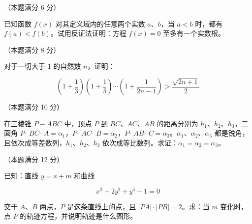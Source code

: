 \begin{question}
（本题满分 6 分）

已知函数 $f(x)$ 对其定义域内的任意两个实数 $a\text{、}b$，当 $a<b$ 时，都有 $f(a)<f(b)$。试用反证法证明：方程 $f(x)=0$ 至多有一个实数根。

\end{question}
\begin{question}
（本题满分 8 分）

对于一切大于 1 的自然数 $n$，证明：

\nopagebreak[4]
\[
\left(1+\frac13\right)\left(1+\frac15\right)\cdots\left(1+\frac1{2n-1}\right)>\frac{\sqrt{2n+1}}2
\]

\end{question}
\begin{question}
（本题满分 10 分）

在三棱锥 $P-ABC$ 中，顶点 $P$ 到 $BC\text{、}AC\text{、}AB$ 的距离分别为 $h_1\text{、}h_2\text{、}h_3$，二面角 $P$- $BC$- $A=\alpha_1$，$P$- $AC$- $B=\alpha_2$，$P$- $AB$- $C=\alpha_3$。$\alpha_1\text{、}\alpha_2\text{、}\alpha_3$ 都是锐角，且依次成等差数列，$h_1\text{、}h_2\text{、}h_3$ 依次成等比数列。求证：$\alpha_1=\alpha_2=\alpha_3$。

\end{question}
\begin{question}
（本题满分 12 分）

已知：直线 $y=x+m$ 和曲线

\nopagebreak[4]
\[
x^2+2y^2+y^4-1=0
\]

交于 $A\text{、}B$ 两点，$P$ 是这条直线上的点，且 $|PA|\cdot|PB|=2$。求：当 $m$ 变化时，点 $P$ 的轨迹方程，并说明轨迹是什么图形。

\end{question}